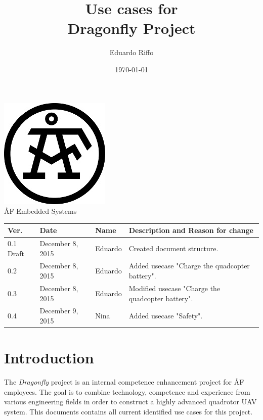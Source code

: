 \documentclass[a4paper]{article}
\title{ Use cases for\\ Dragonfly Project}
\author{Eduardo Riffo}
\date{\today}         		%
\begin{document}

\maketitle                      	%

\begin{center}
\vspace{64pt}
\includegraphics[scale=1.6]{images/AF_Logotype20141_Black.png}
\vspace{16pt}
\\ \large ÅF Embedded Systems
\end{center}

\vspace{16pt}
\begin{tabular}{ l l l p{8.5cm} }
	Ver. & Date & Name & Description and Reason for change \\\hline
	0.1 Draft & December 8, 2015 & Eduardo & Created document structure.\\
	0.2  & December 8, 2015 & Eduardo & Added usecase "Charge the quadcopter battery".\\
	0.3  & December 8, 2015 & Eduardo & Modified usecase "Charge the quadcopter battery".\\
	0.4	& December 9, 2015	& Nina	& Added usecase "Safety".\\
\end{tabular}

\newpage

\tableofcontents					%

\newpage

\section{Introduction}

The \emph{Dragonfly} project is an internal competence enhancement project for ÅF employees. The goal is to combine technology, competence and experience from various engineering fields in order to construct a highly advanced quadrotor UAV system. This documents contains all current identified use cases for this project.
\end{document}
